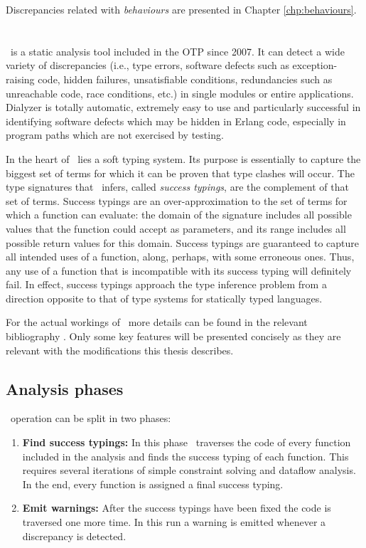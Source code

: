 Discrepancies related with \emph{behaviours} are presented in Chapter
\ref{chp:behaviours}.

\section{\dr}
\label{sct:dialyzer_preliminaries}

\dr\ is a static analysis tool included in the OTP since 2007. It can
detect a wide variety of discrepancies (i.e., type errors, software
defects such as exception-raising code, hidden failures, unsatisfiable
conditions, redundancies such as unreachable code, race conditions,
etc.) in single modules or entire applications. Dialyzer is totally
automatic, extremely easy to use and particularly successful in
identifying software defects which may be hidden in Erlang code,
especially in program paths which are not exercised by testing.

In the heart of \dr\ lies a soft typing system. Its purpose is
essentially to capture the biggest set of terms for which it can be
proven that type clashes will occur. The type signatures that
\dr\ infers, called \emph{success typings}, are the complement of that
set of terms. Success typings are an over-approximation to the set of
terms for which a function can evaluate: the domain of the signature
includes all possible values that the function could accept as
parameters, and its range includes all possible return values for this
domain. Success typings are guaranteed to capture all intended uses of
a function, along, perhaps, with some erroneous ones. Thus, any use of
a function that is incompatible with its success typing will
definitely fail. In effect, success typings approach the type
inference problem from a direction opposite to that of type systems
for statically typed languages.

For the actual workings of \dr\ more details can be found in the
relevant bibliography \cite{Elli, type_system,
  springerlink:10.1007/978-3-540-30477-7_7, SuccessTypings@PPDP-06,
  GradualTyping@Erlang-08}. Only some key features will be presented
concisely as they are relevant with the modifications this thesis
describes.

\subsection{Analysis phases}

\dr\ operation can be split in two phases:

\begin{enumerate}
\item \textbf{Find success typings:} In this phase \dr\ traverses the
  code of every function included in the analysis and finds the
  success typing of each function. This requires several iterations of
  simple constraint solving and dataflow analysis. In the end, every
  function is assigned a final success typing.
\item \textbf{Emit warnings:} After the success typings have been
  fixed the code is traversed one more time. In this run a warning is
  emitted whenever a discrepancy is detected.
\end{enumerate}

